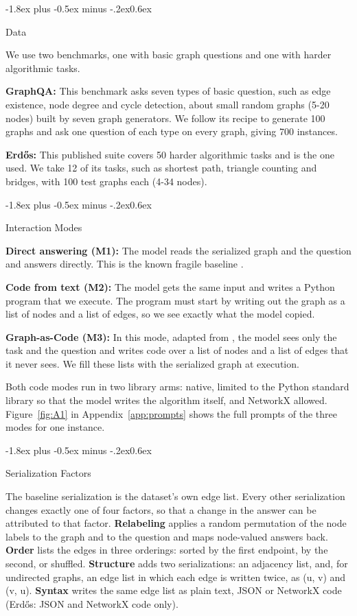 \documentclass[11pt]{article}
\makeatletter
\renewcommand\subsection{\@startsection{subsection}{2}{\z@}
  {-1.8ex plus -0.5ex minus -.2ex}{0.6ex}
  {\normalsize\bfseries\raggedright}}
\makeatother
\begin{document}
\subsection{Data}

We use two benchmarks, one with basic graph questions and one with harder algorithmic tasks.

\textbf{GraphQA:} This benchmark \citep{fatemi} asks seven types of basic question, such as edge existence, node degree and cycle detection, about small random graphs (5-20 nodes) built by seven graph generators. We follow its recipe to generate 100 graphs and ask one question of each type on every graph, giving 700 instances.

\textbf{Erdős:} This published suite \citep{guo} covers 50 harder algorithmic tasks and is the one \citet{herbst} used. We take 12 of its tasks, such as shortest path, triangle counting and bridges, with 100 test graphs each (4-34 nodes).

\subsection{Interaction Modes}\label{sec:modes}

\textbf{Direct answering (M1):} The model reads the serialized graph and the question and answers directly. This is the known fragile baseline \citep{herbst}.

\textbf{Code from text (M2):} The model gets the same input and writes a Python program that we execute. The program must start by writing out the graph as a list of nodes and a list of edges, so we see exactly what the model copied.

\textbf{Graph-as-Code (M3):} In this mode, adapted from \citet{finkelshtein}, the model sees only the task and the question and writes code over a list of nodes and a list of edges that it never sees. We fill these lists with the serialized graph at execution.

Both code modes run in two library arms: native, limited to the Python standard library so that the model writes the algorithm itself, and NetworkX allowed. Figure~\ref{fig:A1} in Appendix~\ref{app:prompts} shows the full prompts of the three modes for one instance.

\subsection{Serialization Factors}\label{sec:factors}

The baseline serialization is the dataset's own edge list. Every other serialization changes exactly one of four factors, so that a change in the answer can be attributed to that factor. \textbf{Relabeling} applies a random permutation of the node labels to the graph and to the question and maps node-valued answers back. \textbf{Order} lists the edges in three orderings: sorted by the first endpoint, by the second, or shuffled. \textbf{Structure} adds two serializations: an adjacency list, and, for undirected graphs, an edge list in which each edge is written twice, as (u, v) and (v, u). \textbf{Syntax} writes the same edge list as plain text, JSON or NetworkX code (Erdős: JSON and NetworkX code only).
\end{document}
